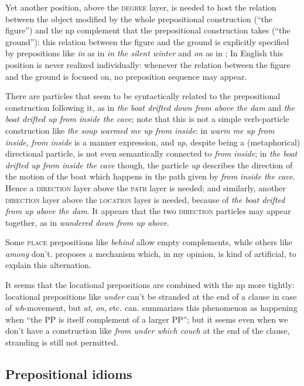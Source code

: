 \documentclass[UTF8, a4paper, oneside, scheme=plain, 12pt]{ctexbook}
\newcommand*{\citepage}[1]{p.~{#1}}
\newcommand{\form}[1]{\emph{#1}}
\newcommand{\category}[1]{\textsc{#1}}
\begin{document}
Yet another position, above the \category{degree} layer, is needed 
to host the relation between the object modified by the whole prepositional construction
(``the figure'')
and the \acs{np} complement that the prepositional construction takes (``the ground''):
this relation between the figure and the ground 
is explicitly specified by prepositions like \form{in} as in \form{in the silent winter}
and \form{on} as in \form{};
In English this position is never realized individually:
whenever the relation between the figure and the ground is focused on, 
no preposition sequence may appear. 

There are particles that 
seem to be syntactically related to the prepositional construction following it,
as in \form{the boat drifted down from above the dam}
and \form{the boat drifted up from inside the cave};
note that this is not a simple verb-particle construction 
like \form{the soup warmed me up from inside}:
in \form{warm me up from inside}, \form{from inside} is a manner expression,
and \form{up}, despite being a (metaphorical) directional particle, 
is not even semantically connected to \form{from inside};
in \form{the boat drifted up from inside the cave} though, 
the particle \form{up} describes the direction of the motion of the boat 
which happens in the path given by \form{from inside the cave}.
Hence a \category{direction} layer above the \category{path} layer is needed; 
and similarly, another \category{direction} layer above the \category{location} layer 
is needed, because of \form{the boat drifted from up above the dam}.
It appears that the two \category{direction} particles may appear together,
as in \form{wandered down from up above}.

Some \category{place} prepositions like \form{behind} allow empty complements,
while others like \form{among} don't.
\cite{spatialpp} proposes a mechanism which, in my opinion, is kind of artificial,
to explain this alternation.


It seems that the locational prepositions are combined with the \acs{np} more tightly:
locational prepositions like \form{under} can't be stranded at the end of a clause 
in case of \form{wh}-movement, 
but \form{at}, \form{on}, etc. can.
\citet[\citepage{630}]{cgel} summarizes this phenomenon as happening when
``the PP is itself complement of a larger PP''; 
but it seems even when we don't have a construction like \form{from under which couch}
at the end of the clause, 
stranding is still not permitted.

\subsection{Prepositional idioms}
\end{document}
